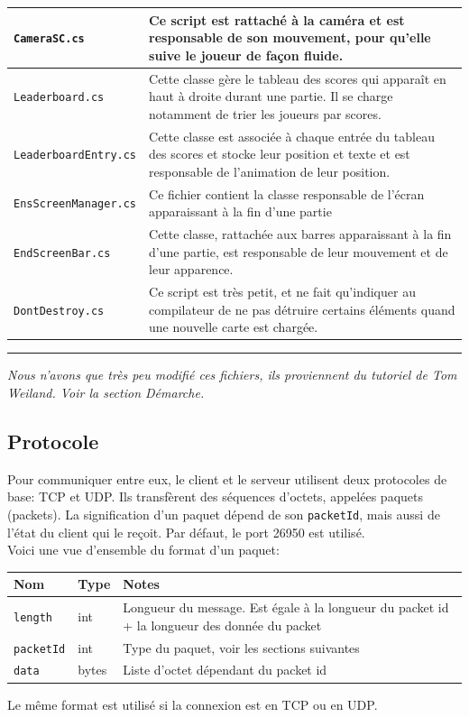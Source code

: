 \documentclass[a4paper]{article}
\begin{document}
\begin{center}
\begin{longtable}{|l|p{10cm}|}
    \hline
    \texttt{CameraSC.cs} & Ce script est rattaché à la caméra et est responsable de son mouvement, pour qu’elle suive le joueur de façon fluide.\\
    \hline
    \texttt{Leaderboard.cs} & Cette classe gère le tableau des scores qui apparaît en haut à droite durant une partie. Il se charge notamment de trier les joueurs par scores.\\
    \hline
    \texttt{LeaderboardEntry.cs} & Cette classe est associée à chaque entrée du tableau des scores et stocke leur position et texte et est responsable de l’animation de leur position.\\
    \hline
    \texttt{EnsScreenManager.cs} & Ce fichier contient la classe responsable de l’écran apparaissant à la fin d’une partie\\
    \hline
    \texttt{EndScreenBar.cs} & Cette classe, rattachée aux barres apparaissant à la fin d’une partie, est responsable de leur mouvement et de leur apparence.\\
    \hline
    \texttt{DontDestroy.cs} & Ce script est très petit, et ne fait qu'indiquer au compilateur de ne pas détruire certains éléments quand une nouvelle carte est chargée.\\
    \hline
\end{longtable}
\end{center}
\hrule
\textit{\footnotemark[1]Nous n’avons que très peu modifié ces fichiers, ils proviennent du tutoriel de Tom Weiland. Voir la section Démarche.}

\subsection{Protocole}
Pour communiquer entre eux, le client et le serveur utilisent deux protocoles de base: TCP\cite{tcp} et
UDP\cite{udp}. Ils transfèrent des séquences d’octets, appelées paquets (packets). La signification d’un paquet dépend de son \texttt{packetId}, mais aussi de l’état du client qui le reçoit. Par défaut, le port 26950 est utilisé. \\
Voici une vue d’ensemble du format d’un paquet:
\begin{center}
\begin{tabular}{|l|l|p{10cm}|}
    \hline
    Nom & Type & Notes \\
    \hline\hline
    \texttt{length} & int & Longueur du message. Est égale à la longueur du packet id + la longueur des donnée du packet \\
    \hline
    \texttt{packetId} & int & Type du paquet, voir les sections suivantes \\
    \hline
    \texttt{data} & bytes & Liste d’octet dépendant du packet id \\
    \hline
\end{tabular}
\end{center}
Le même format est utilisé si la connexion est en TCP ou en UDP.
\end{document}
